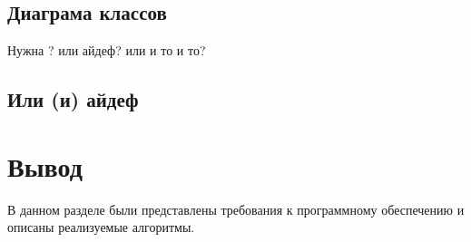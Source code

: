 \subsection{Диаграма классов}

Нужна ? или айдеф? или и то и то?

\subsection{Или (и) айдеф}

\section*{Вывод}

В данном разделе были представлены требования к программному обеспечению и описаны реализуемые алгоритмы.

